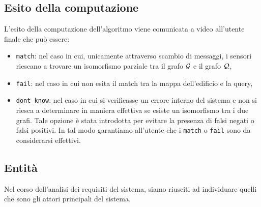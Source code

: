 \documentclass{llncs}
\begin{document}
\subsection{Esito della computazione}
L'esito della computazione dell'algoritmo viene comunicata a video all'utente finale che può essere:
\begin{itemize}
	\item \texttt{match}: nel caso in cui, unicamente attraverso scambio di messaggi, i sensori riescano a trovare
	 un isomorfismo parziale tra il grafo $\mathcal{G}$ e il grafo $\mathcal{Q}$,
	\item \texttt{fail}: nel caso in cui non esita il match tra la mappa dell'edificio e la query,
	\item \texttt{dont\_know}: nel caso in cui si verificasse un errore interno del sistema e 
	non si riesca a determinare in maniera effettiva se esiste un isomorfismo tra i due grafi. Tale opzione 
	è stata introdotta per evitare la presenza di falsi negati o falsi positivi. In tal modo garantiamo all'utente 
	che i  \texttt{match} o \texttt{fail} sono da considerarsi effettivi.
\end{itemize}

\subsection{Entità}
Nel corso dell'analisi dei requisiti del sistema, siamo riusciti ad individuare quelli che sono 
gli attori principali del sistema.
\end{document}
